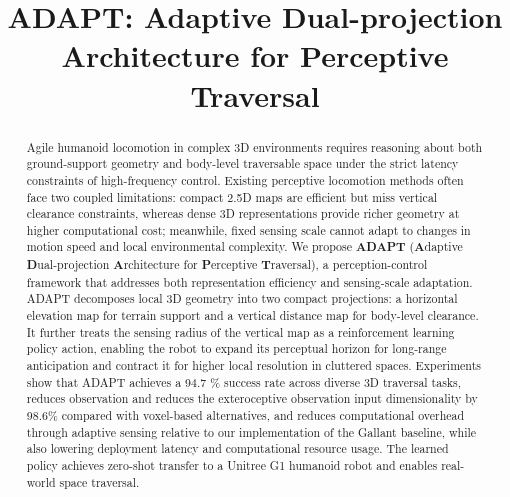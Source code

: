\documentclass[letterpaper, 10 pt, conference]{ieeeconf/ieeeconf}
\title{\LARGE \bf
ADAPT: Adaptive Dual-projection Architecture for Perceptive Traversal 
}
\providecommand{\DIFadd}[1]{{\protect\color{blue} \sf #1}} %
\providecommand{\DIFdel}[1]{{\protect\color{red} \scriptsize #1}} %
\providecommand{\DIFaddbegin}{} %
\providecommand{\DIFaddend}{} %
\providecommand{\DIFdelbegin}{} %
\providecommand{\DIFdelend}{} %
\begin{document}
\maketitle
\thispagestyle{empty}
\pagestyle{empty}

\begin{abstract}
% 
% 
Agile humanoid locomotion in complex 3D environments requires reasoning about both ground-support geometry and body-level traversable space under the strict latency constraints of high-frequency control. Existing perceptive locomotion methods often face two coupled limitations: compact 2.5D maps are efficient but miss vertical clearance constraints, whereas dense 3D representations provide richer geometry at higher computational cost; meanwhile, fixed sensing scale cannot adapt to changes in motion speed and local environmental complexity. We propose \textbf{ADAPT} (\textbf{A}daptive \textbf{D}ual-projection \textbf{A}rchitecture for \textbf{P}erceptive \textbf{T}raversal), a perception-control framework that addresses both representation efficiency and sensing-scale adaptation. ADAPT decomposes local 3D geometry into two compact projections: a horizontal elevation map for terrain support and a vertical distance map for body-level clearance. It further treats the sensing radius of the vertical map as a reinforcement learning policy action, enabling the robot to expand its perceptual horizon for long-range anticipation and contract it for higher local resolution in cluttered spaces. Experiments show that ADAPT achieves a \DIFdelbegin \DIFdel{94.7}\DIFdelend \DIFaddbegin \DIFadd{94.75}\DIFaddend \% success rate across diverse 3D traversal tasks, \DIFdelbegin \DIFdel{reduces observation }\DIFdelend \DIFaddbegin \DIFadd{and reduces the exteroceptive observation input }\DIFaddend dimensionality by 98.6\% \DIFdelbegin \DIFdel{compared with voxel-based alternatives, and reduces computational overhead through adaptive sensing}\DIFdelend \DIFaddbegin \DIFadd{relative to our implementation of the Gallant baseline, while also lowering deployment latency and computational resource usage}\DIFaddend . The learned policy achieves zero-shot transfer to a Unitree G1 humanoid robot and enables real-world space traversal.
\end{abstract}    
\end{document}
